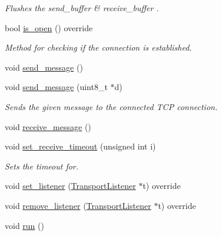 \begin{DoxyCompactItemize}
\begin{DoxyCompactList}\small\item\em Flushes the send\+\_\+buffer \& receive\+\_\+buffer . \end{DoxyCompactList}\item 
\hypertarget{class_t_c_p_socket_a1cce60b6b2d343bb13692d313c23330f}{}bool \hyperlink{class_t_c_p_socket_a1cce60b6b2d343bb13692d313c23330f}{is\+\_\+open} () override\label{class_t_c_p_socket_a1cce60b6b2d343bb13692d313c23330f}

\begin{DoxyCompactList}\small\item\em Method for checking if the connection is established. \end{DoxyCompactList}\item 
void \hyperlink{class_t_c_p_socket_ab3821e52ca9e792223d9dbc1c45f722f}{send\+\_\+message} ()
\item 
\hypertarget{class_t_c_p_socket_af9110e6f5eb1a535b0b1d4c4ddf20c85}{}void \hyperlink{class_t_c_p_socket_af9110e6f5eb1a535b0b1d4c4ddf20c85}{send\+\_\+message} (uint8\+\_\+t $\ast$d)\label{class_t_c_p_socket_af9110e6f5eb1a535b0b1d4c4ddf20c85}

\begin{DoxyCompactList}\small\item\em Sends the given message to the connected T\+C\+P connection. \end{DoxyCompactList}\item 
void \hyperlink{class_t_c_p_socket_aacbd74adbc7c55fa4176c76021a043e7}{receive\+\_\+message} ()
\item 
\hypertarget{class_t_c_p_socket_a33138c2dbceb68dcc417e8c81ba35188}{}void \hyperlink{class_t_c_p_socket_a33138c2dbceb68dcc417e8c81ba35188}{set\+\_\+receive\+\_\+timeout} (unsigned int i)\label{class_t_c_p_socket_a33138c2dbceb68dcc417e8c81ba35188}

\begin{DoxyCompactList}\small\item\em Sets the timeout for. \end{DoxyCompactList}\item 
void \hyperlink{class_t_c_p_socket_a074a08d48b3ec4e758f0d5fc287a32c2}{set\+\_\+listener} (\hyperlink{class_transport_listener}{Transport\+Listener} $\ast$t) override
\item 
void \hyperlink{class_t_c_p_socket_ab7bce90af0f70773836fab6b7edc6fbd}{remove\+\_\+listener} (\hyperlink{class_transport_listener}{Transport\+Listener} $\ast$t) override
\item 
void \hyperlink{class_t_c_p_socket_adfe57d4441473459b2150556fd6f421b}{run} ()
\end{DoxyCompactItemize}
